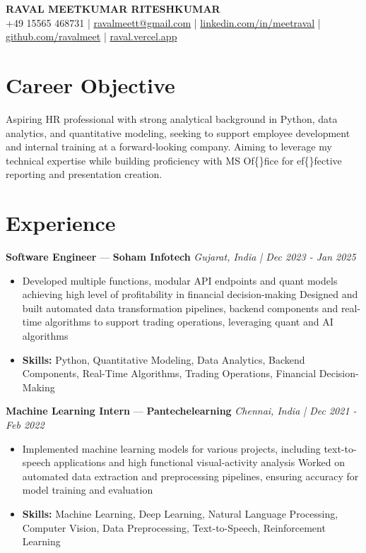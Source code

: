 \documentclass[a4paper,10pt]{article}
\begin{document}
\begin{center}
  {\Large\bfseries RAVAL MEETKUMAR RITESHKUMAR}\\[2pt]
  {\small +49 15565 468731 \;|\; \href{mailto:ravalmeett@gmail.com}{ravalmeett@gmail.com} \;|\; \href{https://www.linkedin.com/in/meetraval/}{linkedin.com/in/meetraval} \;|\; \href{https://github.com/ravalmeet}{github.com/ravalmeet} \;|\; \href{https://raval.vercel.app/}{raval.vercel.app}}
\end{center}
\vspace{-3pt}

\section*{Career Objective}
Aspiring HR professional with strong analytical background in Python, data analytics, and quantitative modeling, seeking to support employee development and internal training at a forward-looking company. Aiming to leverage my technical expertise while building proficiency with MS Of\{\}fice for ef\{\}fective reporting and presentation creation.\par

\section*{Experience}
\textbf{Software Engineer} — \textbf{Soham Infotech} \hfill \textit{Gujarat, India \;|\; Dec 2023 - Jan 2025}\par
\vspace{1pt}
\begin{itemize}
  \item Developed multiple functions, modular API endpoints and quant models achieving high level of profitability in financial decision-making Designed and built automated data transformation pipelines, backend components and real-time algorithms to support trading operations, leveraging quant and AI algorithms
  \item \textbf{Skills:} Python, Quantitative Modeling, Data Analytics, Backend Components, Real-Time Algorithms, Trading Operations, Financial Decision-Making
\end{itemize}
\vspace{3pt}
\textbf{Machine Learning Intern} — \textbf{Pantechelearning} \hfill \textit{Chennai, India \;|\; Dec 2021 - Feb 2022}\par
\vspace{1pt}
\begin{itemize}
  \item Implemented machine learning models for various projects, including text-to-speech applications and high functional visual-activity analysis Worked on automated data extraction and preprocessing pipelines, ensuring accuracy for model training and evaluation
  \item \textbf{Skills:} Machine Learning, Deep Learning, Natural Language Processing, Computer Vision, Data Preprocessing, Text-to-Speech, Reinforcement Learning
\end{itemize}
\end{document}
